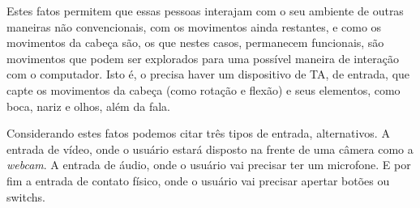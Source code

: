 


Estes fatos permitem que essas pessoas interajam com o seu ambiente de outras maneiras não convencionais, com os movimentos ainda restantes, e como os movimentos da cabeça são, os que nestes casos, permanecem funcionais, são movimentos que podem ser explorados para uma possível maneira de interação com o computador.
Isto é, o precisa haver um dispositivo de TA, de entrada, que capte os movimentos da cabeça (como rotação e flexão) e seus elementos, como boca, nariz e olhos, além da fala. 

Considerando estes fatos podemos citar três tipos de entrada, alternativos. 
A entrada de vídeo, onde o usuário estará disposto na frente de uma câmera como a \textit{webcam}. A entrada de áudio, onde o usuário vai precisar ter um microfone. E por fim a entrada de contato físico, onde o usuário vai precisar apertar botões ou switchs.

% 
% 

% 
% 

